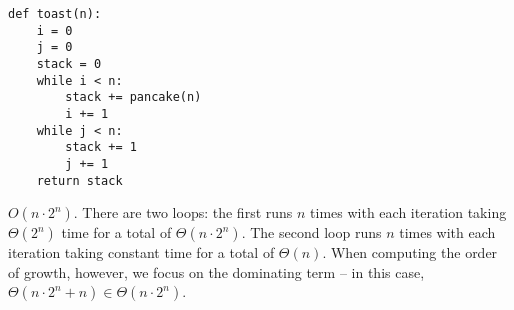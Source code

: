 \begin{blocksection}
\question \begin{lstlisting}
def toast(n):
    i = 0
    j = 0
    stack = 0
    while i < n:
        stack += pancake(n)
        i += 1
    while j < n:
        stack += 1
        j += 1
    return stack
\end{lstlisting}

\begin{solution}
$O(n \cdot 2^n)$. There are two loops: the first runs $n$ times with each iteration taking $\Theta(2^n)$ time for a total of $\Theta(n \cdot 2^n)$. The second loop runs $n$ times with each iteration taking constant time for a total of $\Theta(n)$. When computing the order of growth, however, we focus on the dominating term -- in this case, $\Theta(n \cdot 2^n + n) \in \Theta(n \cdot 2^n)$.
\end{solution}
\end{blocksection}
